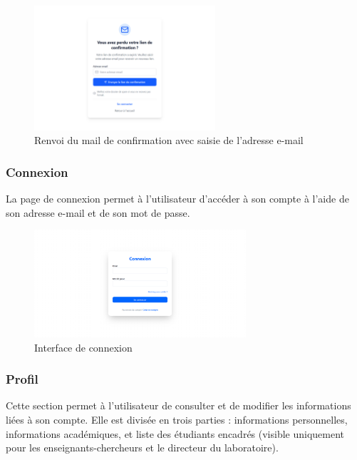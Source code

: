 \begin{figure}[H]
    \centering
    \includegraphics[width=0.6\textwidth]{images/interface/renvoie_mail_avec_mail.png}
    \caption{Renvoi du mail de confirmation avec saisie de l’adresse e-mail}
    \label{fig:renvoie_mail_avec_saisie}
\end{figure}

\subsubsection{Connexion}

La page de connexion permet à l’utilisateur d’accéder à son compte à l’aide de son adresse e-mail et de son mot de passe.

\begin{figure}[H]
    \centering
    \includegraphics[width=0.7\textwidth]{images/interface/connexion.png}
    \caption{Interface de connexion}
    \label{fig:connexion}
\end{figure}

\subsubsection{Profil}

Cette section permet à l’utilisateur de consulter et de modifier les informations liées à son compte. Elle est divisée en trois parties : informations personnelles, informations académiques, et liste des étudiants encadrés (visible uniquement pour les enseignants-chercheurs et le directeur du laboratoire).

